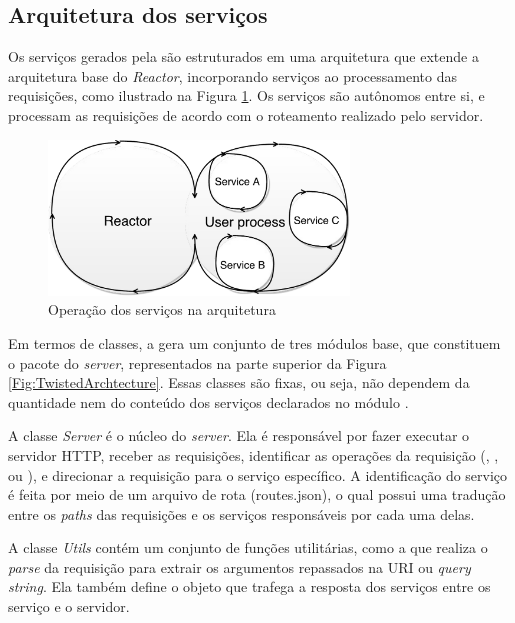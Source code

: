 \subsection{Arquitetura dos serviços \twisted{}}
\label{ArquiteturaTwisted}

Os serviços \twisted{} gerados pela \neoidl{} são estruturados em uma
arquitetura que extende a arquitetura base do \twisted{} \emph{Reactor},
incorporando serviços ao processamento das requisições, como ilustrado na Figura
\ref{Fig:TwistedReactorServices}. Os serviços são autônomos entre si, e
processam as requisições de acordo com o roteamento realizado pelo servidor.

\begin{figure}[!htb]
\centering
\includegraphics[width=80mm,trim = 0mm 0mm 0mm
0mm,clip]{img/TwistedReactorServices.pdf}
\caption{Operação dos serviços na arquitetura \twisted{}}
\label{Fig:TwistedReactorServices}
\end{figure}

Em termos de classes, a \neoidl{} gera um conjunto de tres módulos base,
que constituem o pacote do \twisted{} \textit{server}, representados na
parte superior da Figura \ref{Fig:TwistedArchtecture}. Essas classes são fixas,
ou seja, não dependem da quantidade nem do conteúdo dos serviços declarados no
módulo \neoidl{}.

A classe \emph{Server} é o núcleo do \twisted{} \textit{server}. Ela é
responsável por fazer executar o servidor HTTP, receber as requisições,
identificar as operações da requisição (, ,  ou ), e
direcionar a requisição para o serviço específico. A identificação do serviço é
feita por meio de um arquivo de rota (routes.json), o qual possui uma tradução
entre os \emph{paths} das requisições e os serviços responsáveis por cada uma
delas.

A classe \emph{Utils} contém um conjunto de funções utilitárias, como a que
realiza o \textit{parse} da requisição para extrair os argumentos repassados
na URI ou \textit{query string}. Ela também define o objeto que trafega a
resposta dos serviços entre os serviço e o servidor.

